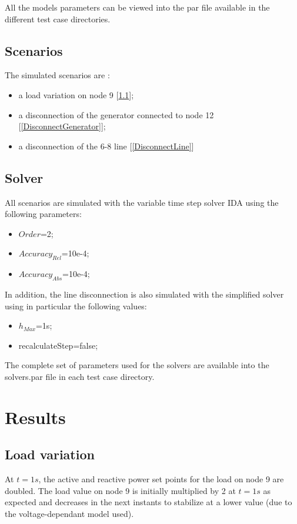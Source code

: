 \documentclass[a4paper, 12pt]{report}
\begin{document}
All the models parameters can be viewed into the par file available in the different test case directories.

\subsection{Scenarios}
The simulated scenarios are :
\begin{itemize}
\item a load variation on node 9 [\ref{LoadVariation}];
\item a disconnection of the generator connected to node 12 [\ref{DisconnectGenerator}];
\item a disconnection of the 6-8 line [\ref{DisconnectLine}]
\end{itemize}

\subsection{Solver}
All scenarios are simulated with the variable time step solver IDA using the following parameters:
\begin{itemize}
\item $Order$=2;
\item $Accuracy_{Rel}$=10e-4;
\item $Accuracy_{Abs}$=10e-4;
\end{itemize}

In addition, the line disconnection is also simulated with the simplified solver using in particular the following values:
\begin{itemize}
\item $h_{Max}$=1s;
\item recalculateStep=false;
\end{itemize}

The complete set of parameters used for the solvers are available into the solvers.par file in each test case directory.

\newpage
\section{Results}

\subsection{Load variation}
\label{LoadVariation}

At $t=1s$, the active and reactive power set points for the load on node 9 are doubled. The load value on node 9 is initially multiplied by 2 at $t=1s$ as expected and decreases in the next instants to stabilize at a lower value (due to the voltage-dependant model used). \\
\end{document}
